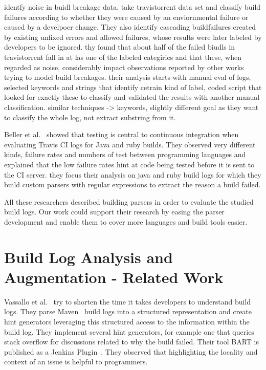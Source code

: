 \documentclass[\myrootdir/main.tex]{subfiles}
\begin{document}
identfy noise in buidl breakage data. take travistorrent data set and classify build failures according to whether they were caused by an enviornmental failure or caused by a develpoer change. They also identify cascading buildfailures created by existing unfixed errors and allowed failures, whose results were later labeled by developers to be ignored.
thy found that about half of the failed biudls in travistorrent fall in at las one of the labeled categiries and that these, when regarded as noise, considerably impact observations reported by other works trying to model build breakages.
their analysis starts with manual eval of logs, selected keywords and strings that identify cetrain kind of label, coded script that looked for exactly these to classify and validated the results with another manual classification.
similar techniques -> keywords, slightly different goal as they want to classify the whole log, not extract substring from it.
~\cite{ghaleb2019studying}

Beller et al.~\cite{beller2017oops} showed that testing is central to continuous integration when evaluating Travis CI logs for Java and ruby builds.
They observed very different kinds, failure rates and numbers of test between programming languages and explained that the low failure rates hint at code being tested before it is sent to the CI server.
they focus their analysis on java and ruby build logs for which they build custom parsers with regular expressions to extract the reason a build failed.


All these researchers described building parsers in order to evaluate the studied build logs.
Our work could support their research by easing the parser development and enable them to cover more languages and build tools easier.

\section{Build Log Analysis and Augmentation - Related Work}
\label{sec:rw-bl-analysis}
Vassallo et al.~\cite{vassallo2018un-break} try to shorten the time it takes developers to understand build logs.
They parse Maven~\cite{maven2019website} build logs into a structured representation and create hint generators leveraging this structured access to the information within the build log.
They implement several hint generators, for example one that queries stack overflow for discussions related to why the build failed.
Their tool BART is published as a Jenkins Plugin~\cite{bart2019plugin}.
They observed that highlighting the locality and context of an issue is helpful to programmers.
\end{document}
